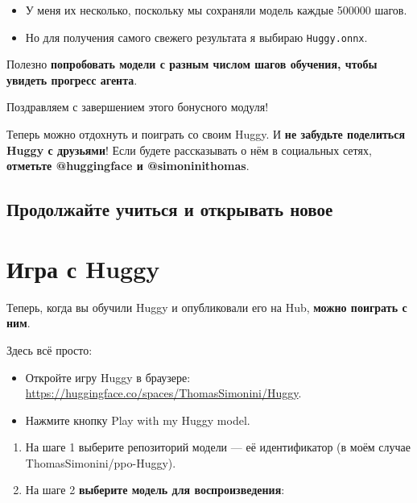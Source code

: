 \documentclass[11pt,a4paper]{article}
\begin{document}
\begin{itemize}
\tightlist
\item
  У меня их несколько, поскольку мы сохраняли модель каждые 500000 шагов.
\item
  Но для получения самого свежего результата я выбираю \texttt{Huggy.onnx}.
\end{itemize}

Полезно \textbf{попробовать модели с разным числом шагов обучения, чтобы увидеть прогресс агента}.

Поздравляем с завершением этого бонусного модуля!

Теперь можно отдохнуть и поиграть со своим Huggy. И \textbf{не забудьте поделиться Huggy с друзьями}! Если будете рассказывать о нём в социальных сетях, \textbf{отметьте @huggingface и @simoninithomas}.


\subsection{Продолжайте учиться и открывать новое}\label{keep-learning-stay-awesome}

\section{Игра с Huggy}\label{play-with-huggy}

Теперь, когда вы обучили Huggy и опубликовали его на Hub, \textbf{можно поиграть с ним}.

Здесь всё просто:

\begin{itemize}
\tightlist
\item
  Откройте игру Huggy в браузере: \url{https://huggingface.co/spaces/ThomasSimonini/Huggy}.
\item
  Нажмите кнопку Play with my Huggy model.
\end{itemize}


\begin{enumerate}
\def\labelenumi{\arabic{enumi}.}
\item
  На шаге 1 выберите репозиторий модели --- её идентификатор (в моём случае ThomasSimonini/ppo-Huggy).
\item
  На шаге 2 \textbf{выберите модель для воспроизведения}:
\end{enumerate}
\end{document}

